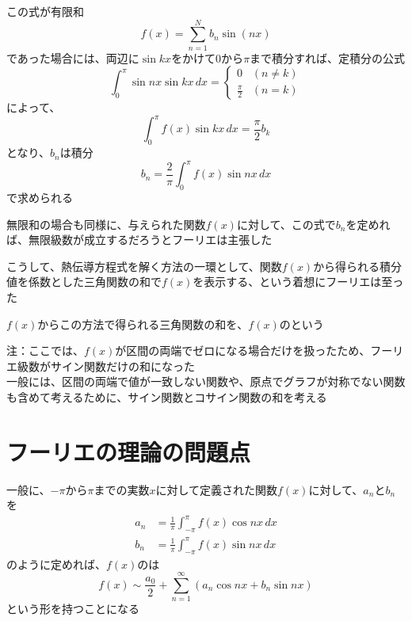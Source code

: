 \documentclass[../book_why-set-theory-why-topology]{subfiles}
\begin{document}
\br

この式が有限和
\begin{equation*}
  f(x) = \sum_{n=1}^N b_n \sin(nx)
\end{equation*}
であった場合には、両辺に$\sin kx$をかけて0から$\pi$まで積分すれば、定積分の公式
\begin{equation*}
  \int_0^\pi \sin nx \sin kx \, dx = \begin{cases}
    0             & (n \neq k) \\
    \frac{\pi}{2} & (n = k)
  \end{cases}
\end{equation*}
によって、
\begin{equation*}
  \int_0^\pi f(x) \sin kx \, dx = \frac{\pi}{2} b_k
\end{equation*}
となり、$b_n$は積分
\begin{equation*}
  b_n = \frac{2}{\pi} \int_0^\pi f(x) \sin nx \, dx
\end{equation*}
で求められる

\br

無限和の場合も同様に、与えられた関数$f(x)$に対して、この式で$b_n$を定めれば、無限級数が成立するだろうとフーリエは主張した

\sectionline

こうして、熱伝導方程式を解く方法の一環として、関数$f(x)$から得られる積分値を係数とした三角関数の和で$f(x)$を表示する、という着想にフーリエは至った

\br

$f(x)$からこの方法で得られる三角関数の和を、$f(x)$のという

\begin{leftbar}
  注：ここでは、$f(x)$が区間の両端でゼロになる場合だけを扱ったため、フーリエ級数がサイン関数だけの和になった \\
  一般には、区間の両端で値が一致しない関数や、原点でグラフが対称でない関数も含めて考えるために、サイン関数とコサイン関数の和を考える
\end{leftbar}

\sectionline
\section{フーリエの理論の問題点}

一般に、$-\pi$から$\pi$までの実数$x$に対して定義された関数$f(x)$に対して、$a_n$と$b_n$を
\begin{align*}
  a_n & = \frac{1}{\pi} \int_{-\pi}^\pi f(x) \cos nx \, dx \\
  b_n & = \frac{1}{\pi} \int_{-\pi}^\pi f(x) \sin nx \, dx
\end{align*}
のように定めれば、$f(x)$のは
\begin{equation*}
  f(x) \sim \dfrac{a_0}{2} + \sum_{n=1}^\infty \left( a_n \cos nx + b_n \sin nx \right)
\end{equation*}
という形を持つことになる
\end{document}

